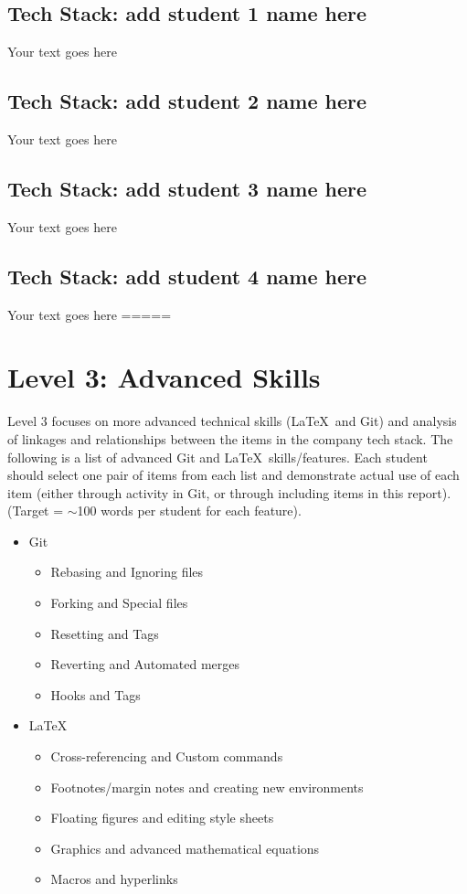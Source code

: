 \documentclass[a4paper, 11pt]{report}
\begin{document}
	\subsection{Tech Stack: add student 1 name here}
	Your text goes here
	\subsection{Tech Stack: add student 2 name here}
	Your text goes here
	\subsection{Tech Stack: add student 3 name here}
	Your text goes here
	\subsection{Tech Stack: add student 4 name here}
	Your text goes here
	=====
	\newpage
	\section{Level 3: Advanced Skills}
	Level 3 focuses on more advanced technical skills (\LaTeX\ and Git) and analysis of
	linkages and relationships between the items in the company tech stack.
	The following is a list of advanced Git and \LaTeX\ skills/features. Each student 
	should select one pair of items from each list and demonstrate actual use of each 
	item (either through activity in Git, or through including items in this report). 
	(Target = $\sim$100 words per student for each feature).
	\begin{itemize}
		\item Git
		\begin{itemize}
			\item Rebasing and Ignoring files
			\item Forking and Special files
			\item Resetting and Tags
			\item Reverting and Automated merges
			\item Hooks and Tags
		\end{itemize}
		\item \LaTeX\ 
		\begin{itemize}
			\item Cross-referencing and Custom commands
			\item Footnotes/margin notes and creating new environments
			\item Floating figures and editing style sheets
			\item Graphics and advanced mathematical equations
			\item Macros and hyperlinks
		\end{itemize}
	\end{itemize}
\end{document}
